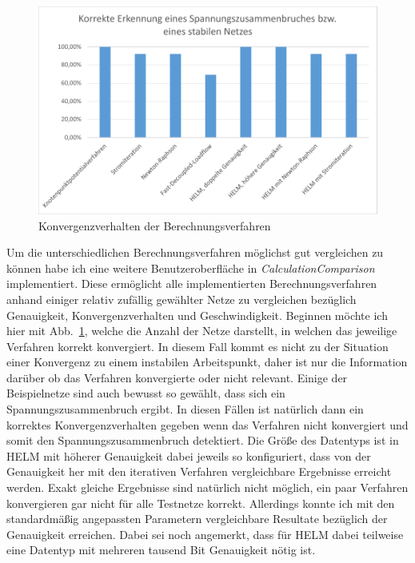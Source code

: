 \documentclass[12pt,a4paper]{article}
\newcommand{\reffig}[1]{{Abb.~\ref{#1}}}
\begin{document}
	\begin{figure}
		\centering
		\includegraphics[scale=0.8]{pictures/convergence}
		\caption{Konvergenzverhalten der Berechnungsverfahren}
		\label{fig:convergence}
	\end{figure}
	
	Um die unterschiedlichen Berechnungsverfahren möglichst gut vergleichen zu können habe ich eine weitere Benutzeroberfläche in \emph{CalculationComparison} implementiert. Diese ermöglicht alle implementierten Berechnungsverfahren anhand einiger relativ zufällig gewählter Netze zu vergleichen bezüglich Genauigkeit, Konvergenzverhalten und Geschwindigkeit. Beginnen möchte ich hier mit \reffig{fig:convergence}, welche die Anzahl der Netze darstellt, in welchen das jeweilige Verfahren korrekt konvergiert. In diesem Fall kommt es nicht zu der Situation einer Konvergenz zu einem instabilen Arbeitspunkt, daher ist nur die Information darüber ob das Verfahren konvergierte oder nicht relevant. Einige der Beispielnetze sind auch bewusst so gewählt, dass sich ein Spannungszusammenbruch ergibt. In diesen Fällen ist natürlich dann ein korrektes Konvergenzverhalten gegeben wenn das Verfahren nicht konvergiert und somit den Spannungszusammenbruch detektiert. Die Größe des Datentyps ist in HELM mit höherer Genauigkeit dabei jeweils so konfiguriert, dass von der Genauigkeit her mit den iterativen Verfahren vergleichbare Ergebnisse erreicht werden. Exakt gleiche Ergebnisse sind natürlich nicht möglich, ein paar Verfahren konvergieren gar nicht für alle Testnetze korrekt. Allerdings konnte ich mit den standardmäßig angepassten Parametern vergleichbare Resultate bezüglich der Genauigkeit erreichen. Dabei sei noch angemerkt, dass für HELM dabei teilweise eine Datentyp mit mehreren tausend Bit Genauigkeit nötig ist.
	
\end{document}
